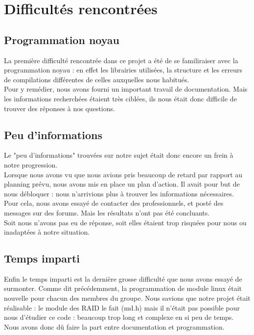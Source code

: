 \documentclass[a4paper,10pt]{article}
\begin{document}
\section{Difficultés rencontrées}
\subsection{Programmation noyau}
La première difficulté rencontrée dans ce projet a été de se familiraiser avec la programmation noyau : en effet les librairies utilisées, la structure et les 
erreurs de compilations différentes de celles auxquelles nous habitués. \medskip\\
Pour y remédier, nous avons fourni un important travail de documentation. Mais les informations recherchées étaient très ciblées, ils nous était donc 
difficile de trouver des réponses à nos questions.

\subsection{Peu d'informations}
Le "peu d'informations" trouvées sur notre sujet était donc encore un frein à notre progression. \medskip\\
Lorsque nous avons vu que nous avions pris beaucoup de retard par rapport au planning prévu, nous avons mis en place un plan d'action. Il avait pour but de 
nous débloquer : nous n'arrivions plus à trouver les informations nécessaires. \medskip\\
Pour cela, nous avons essayé de contacter des professionnels, et posté des messages sur des forums. Mais les résultats n'ont pas été concluants.\\
Soit nous n'avons pas eu de réponse, soit elles étaient trop risquées pour nous ou inadaptées à notre situation.

\subsection{Temps imparti}
Enfin le temps imparti est la dernière grosse difficulté que nous avons essayé de surmonter. Comme dit précédemment, la programmation de module linux était 
nouvelle pour chacun des membres du groupe. Nous savions que notre projet était réalisable : le module des RAID le fait (md.h) mais il n'était pas possible 
pour nous d'étudier ce code : beaucoup trop long et complexe en si peu de temps.\medskip\\
Nous avons donc dû faire la part entre documentation et programmation.
\end{document}
